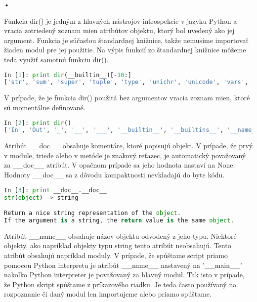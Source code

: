\documentclass[11pt,oneside,final]{fithesis2}
\begin{document}
\begin{list}{•}{}
		\item 
			Funkcia dir() je jedným z hlavných nástrojov introspekcie v jazyku Python a vracia zotriedený zoznam mien atribútov objektu, ktorý bol uvedený ako jej argument. Funkcia je súčasťou štandardnej knižnice, takže nemusíme importovať žiaden modul pre jej použitie. Na výpis funkcií zo štandardnej knižnice môžeme teda využiť samotnú funkciu dir().
			

\begin{lstlisting}[language=python]
In [1]: print dir(__builtin__)[-10:]
['str', 'sum', 'super', 'tuple', 'type', 'unichr', 'unicode', 'vars', 'xrange', 'zip']
\end{lstlisting}

			 V prípade, že je funkcia dir() použitá bez argumentov vracia zoznam mien, ktoré sú momentálne definované.

\begin{lstlisting}[language=python]
In [2]: print dir()
['In', 'Out', '_', '__', '___', '__builtin__', '__builtins__', '__name__', '_dh', '_i', '_i1', '_i2', '_ih', '_ii', '_iii', '_oh', '_sh', 'exit', 'get_ipython', 'help', 'quit']

\end{lstlisting}
	

		\item 
			Atribút \_\_doc\_\_ obsahuje komentáre, ktoré popisujú objekt. V prípade, že prvý v module, triede alebo v metóde je znakový reťazec, je automatický považovaný za \_\_doc\_\_ atribút. V opačnom prípade sa jeho hodnota nastaví na None. Hodnoty \_\_doc\_\_ sa z dôvodu kompaktnosti nevkladajú do byte kódu.
			
\begin{lstlisting}[language=python]
In [3]: print __doc__.__doc__
str(object) -> string

Return a nice string representation of the object.
If the argument is a string, the return value is the same object.
\end{lstlisting}

		\item 
			Atribút \_\_name\_\_ obsahuje názov objektu odvodený z jeho typu. Niektoré objekty, ako napríklad objekty typu string tento atribút neobsahujú. Tento atribút obsahujú napríklad moduly. V prípade, že spúštame script priamo pomocou Python interpretu je atribút \_\_name\_\_ nastavený na '\_\_main\_\_' nakoľko Python interpreter je považovaný za hlavný modul. Tak isto v prípade, že Python skript spúštame z príkazového riadku. Je teda často používaný na rozpoznanie či daný modul len importujeme alebo priamo spúštame.
	

\end{list}
\end{document}
